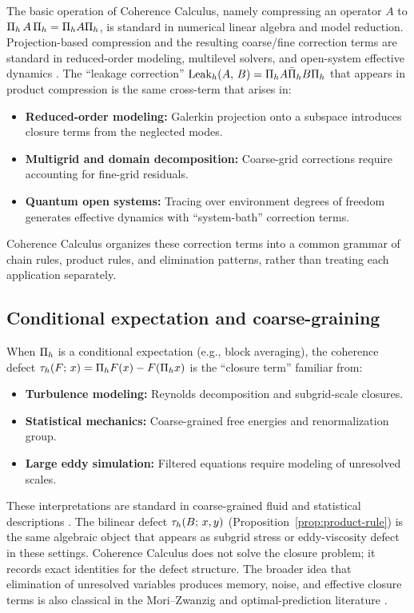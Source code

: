 The basic operation of Coherence Calculus, namely compressing an operator $A$
to $\Pi_{h}\, A \,\Pi_{h} = \Pi_{h} A \Pi_{h}$, is standard in numerical linear
algebra and model reduction.
Projection-based compression and the resulting coarse/fine correction terms are
standard in reduced-order modeling, multilevel solvers, and open-system
effective dynamics \cite{Antoulas2005,BriggsHensonMcCormick2000,BreuerPetruccione2002}.
The ``leakage correction'' $\mathrm{Leak}_{h}(A,\, B) = \Pi_{h} A \bar{\Pi}_{h} B \Pi_{h}$ that appears in product compression is the same cross-term that arises in:
\begin{itemize}[itemsep=0.2em]
\item \textbf{Reduced-order modeling:} Galerkin projection onto a subspace introduces closure terms from the neglected modes.
\item \textbf{Multigrid and domain decomposition:} Coarse-grid corrections require accounting for fine-grid residuals.
\item \textbf{Quantum open systems:} Tracing over environment degrees of freedom generates effective dynamics with ``system-bath'' correction terms.
\end{itemize}
Coherence Calculus organizes these correction terms into a common grammar of
chain rules, product rules, and elimination patterns, rather than treating
each application separately.

\subsection{Conditional expectation and coarse-graining}
\label{subsec:coarse-graining}

When $\Pi_{h}$ is a conditional expectation (e.g., block averaging), the coherence defect $\tau_{h}(F;\, x) = \Pi_{h} F(x) - F(\Pi_{h} x)$ is the ``closure term'' familiar from:
\begin{itemize}[itemsep=0.2em]
\item \textbf{Turbulence modeling:} Reynolds decomposition and subgrid-scale closures.
\item \textbf{Statistical mechanics:} Coarse-grained free energies and renormalization group.
\item \textbf{Large eddy simulation:} Filtered equations require modeling of unresolved scales.
\end{itemize}
These interpretations are standard in coarse-grained fluid and statistical
descriptions \cite{Pope2000,Goldenfeld1992}.
The bilinear defect $\tau_{h}(B;\, x, y)$
(Proposition~\ref{prop:product-rule}) is the same algebraic object that
appears as subgrid stress or eddy-viscosity defect in these settings.
Coherence Calculus does not solve the closure problem; it records exact
identities for the defect structure. The broader idea that elimination of
unresolved variables produces memory, noise, and effective closure terms is
also classical in the Mori--Zwanzig and optimal-prediction literature
\cite{Zwanzig1961,Mori1965,ChorinHaldKupferman2000}.

